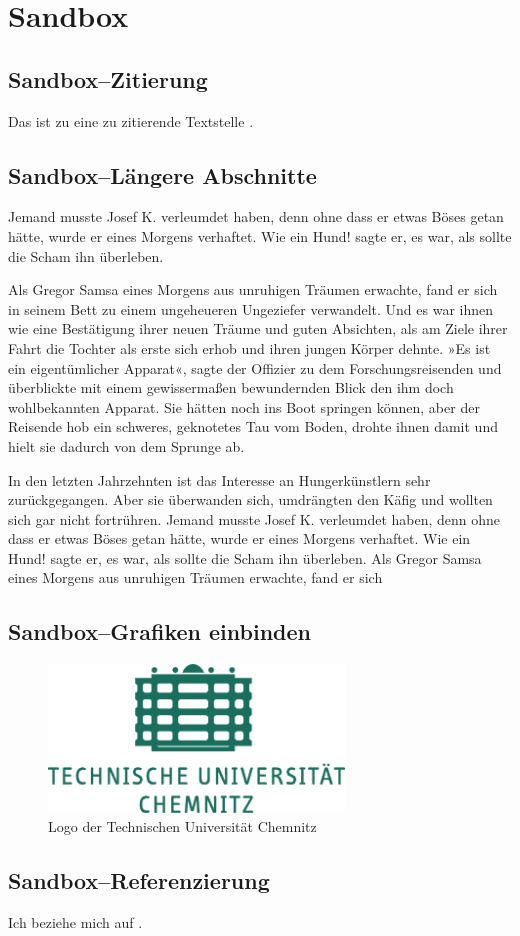 \section{Sandbox}

\subsection{Sandbox--Zitierung}

Das ist zu eine zu zitierende Textstelle \cite{Klocke2008}.

\subsection{Sandbox--Längere Abschnitte}
Jemand musste Josef K. verleumdet haben, denn ohne dass er etwas Böses getan hätte, wurde er eines
Morgens verhaftet. Wie ein Hund! sagte er, es war, als sollte die Scham ihn überleben.

Als Gregor Samsa eines Morgens aus unruhigen Träumen erwachte, fand er sich in seinem Bett zu einem
ungeheueren Ungeziefer verwandelt. Und es war ihnen wie eine Bestätigung ihrer neuen Träume und
guten Absichten, als am Ziele ihrer Fahrt die Tochter als erste sich erhob und ihren jungen Körper
dehnte.
»Es ist ein eigentümlicher Apparat«, sagte der Offizier zu dem Forschungsreisenden und überblickte
mit einem gewissermaßen bewundernden Blick den ihm doch wohlbekannten Apparat. Sie hätten noch ins
Boot springen können, aber der Reisende hob ein schweres, geknotetes Tau vom Boden, drohte ihnen
damit und hielt sie dadurch von dem Sprunge ab.

In den letzten Jahrzehnten ist das Interesse an Hungerkünstlern sehr zurückgegangen. Aber sie
überwanden sich, umdrängten den Käfig und wollten sich gar nicht fortrühren. Jemand musste Josef K.
verleumdet haben, denn ohne dass er etwas Böses getan hätte, wurde er eines Morgens verhaftet. Wie
ein Hund! sagte er, es war, als sollte die Scham ihn überleben. Als Gregor Samsa eines Morgens aus
unruhigen Träumen erwachte, fand er sich



\subsection{Sandbox--Grafiken einbinden}

\begin{figure}[htbp] 
  \centering
     \includegraphics[width=0.7\textwidth]{img/logo_tuc.pdf}
  \caption{Logo der Technischen Universität Chemnitz}
  \label{fig:Bild1}
\end{figure}

\newpage

\newpage


\subsection{Sandbox--Referenzierung}

Ich beziehe mich auf .